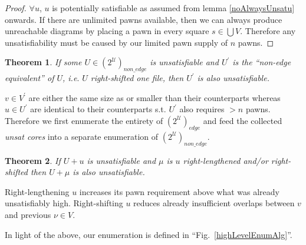 \documentclass{amsart}
\newtheorem{theorem}{Theorem}[section]
\begin{document}
\begin{proof}
	$\forall u$, $u$ is potentially satisfiable as assumed from lemma \ref{noAlwaysUnsatu} onwards. If there are unlimited pawns available, then we can always produce unreachable diagrams by placing a pawn in every square $s \in \bigcup V$. Therefore any unsatisfiability must be caused by our limited pawn supply of $n$ pawns.
\end{proof}

\begin{theorem}
	If some $U \in (2^\mathcal{U})_{non\_edge}$ is unsatisfiable and $U^\prime$ is the ``non-edge equivalent'' of $U$, i.e$.$ $U$ right-shifted one file, then $U^\prime$ is also unsatisfiable.
\end{theorem}

$v \in V^\prime$ are either the same size as or smaller than their counterparts whereas $u \in U^\prime$ are identical to their counterparts s.t$.$ $U^\prime$ also requires $>n$ pawns. Therefore we first enumerate the entirety of $(2^\mathcal{U})_{edge}$ and feed the collected \textit{unsat cores} into a separate enumeration of $(2^\mathcal{U})_{non\_edge}$.

\begin{theorem} \label{lengthenedu}
	If $U + u$ is unsatisfiable and $\mu$ is $u$ right-lengthened and/or right-shifted then $U + \mu$ is also unsatisfiable.
\end{theorem}

Right-lengthening $u$ increases its pawn requirement above what was already unsatisfiably high. Right-shifting $u$ reduces already insufficient overlaps between $v$ and previous $\nu \in V$.

In light of the above, our enumeration is defined in ``Fig.~\ref{highLevelEnumAlg}''.
 
\end{document}
